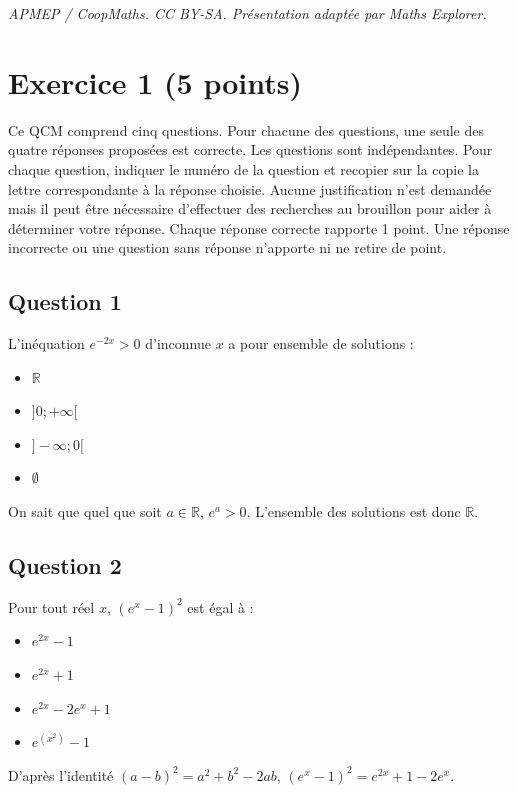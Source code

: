 \documentclass[10pt]{article}
\begin{document}
\noindent\textit{APMEP / CoopMaths. CC BY-SA. Présentation adaptée par Maths Explorer.}\par\medskip
\section*{Exercice 1 (5 points)}
	
	Ce QCM comprend cinq questions. Pour chacune des questions, une seule des quatre réponses proposées est correcte. Les questions sont indépendantes. Pour chaque question, indiquer le numéro de la question et recopier sur la copie la lettre correspondante à la réponse choisie. Aucune justification n’est demandée mais il peut être nécessaire d’effectuer des recherches au brouillon pour aider à déterminer votre réponse. Chaque réponse correcte rapporte 1 point. Une réponse incorrecte ou une question sans réponse n’apporte ni ne retire de point.
	
	\subsection*{Question 1}
	L’inéquation $e^{-2x} > 0$ d’inconnue $x$ a pour ensemble de solutions :
	
	\begin{itemize}
		\item[a.] $\mathbb{R}$
		\item[b.] $]0 ; +\infty[$
		\item[c.] $]-\infty ; 0[$
		\item[d.] $\emptyset$
	\end{itemize}
	
	On sait que quel que soit $a \in \mathbb{R}$, $e^a > 0$. L’ensemble des solutions est donc $\mathbb{R}$.
	
	\subsection*{Question 2}
	Pour tout réel $x$, $(e^x - 1)^2$ est égal à :
	
	\begin{itemize}
		\item[a.] $e^{2x} - 1$
		\item[b.] $e^{2x} + 1$
		\item[c.] $e^{2x} - 2e^x + 1$
		\item[d.] $e^{(x^2)} - 1$
	\end{itemize}
	
	D’après l’identité $(a - b)^2 = a^2 + b^2 - 2ab$, $(e^x - 1)^2 = e^{2x} + 1 - 2e^x$.
	
\end{document}
